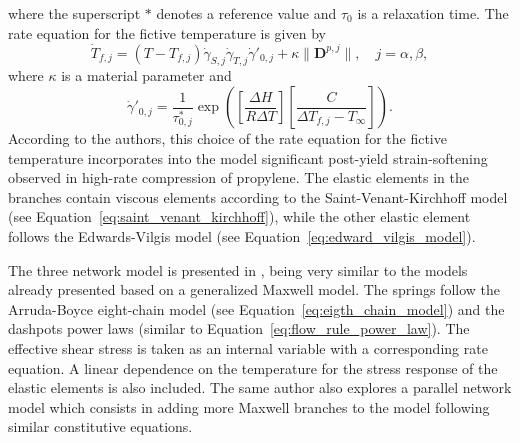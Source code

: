 where the superscript $*$ denotes a reference value and $\tau_0$ is a relaxation time.
The rate equation for the fictive temperature is given by
\begin{equation}
	\dot T_{f,j} = (T - T_{f,j})\dot\gamma_{S,j}\dot\gamma_{T,j}\dot\gamma'_{0,j} + \kappa \|\bm D^{p,j}\|,\quad j = \alpha, \beta,
\end{equation}
where $\kappa$ is a material parameter and
\begin{equation}
	\dot \gamma'_{0,j} = \frac{1}{\tau^*_{0,j}} \exp\left(\left[\frac{\Delta H}{R\Delta T}\right]\left[\frac{C}{\Delta T_{f,j} - T_\infty}\right]\right).
\end{equation}
According to the authors, this choice of the rate equation for the fictive temperature incorporates into the model significant post-yield strain-softening observed in high-rate compression of propylene.
The elastic elements in the branches contain viscous elements according to the Saint-Venant-Kirchhoff model (see Equation~\eqref{eq:saint_venant_kirchhoff}), while the other elastic element follows the Edwards-Vilgis model (see Equation~\eqref{eq:edward_vilgis_model}).

The three network model is presented in \cite{bergstromMechanicsSolidPolymers2015}, being very similar to the models already presented based on a generalized Maxwell model.
The springs follow the Arruda-Boyce eight-chain model (see Equation~\eqref{eq:eigth_chain_model}) and the dashpots power laws (similar to Equation~\eqref{eq:flow_rule_power_law}).
The effective shear stress is taken as an internal variable with a corresponding rate equation.
A linear dependence on the temperature for the stress response of the elastic elements is also included.
The same author also explores a parallel network model which consists in adding more Maxwell branches to the model following similar constitutive equations.

